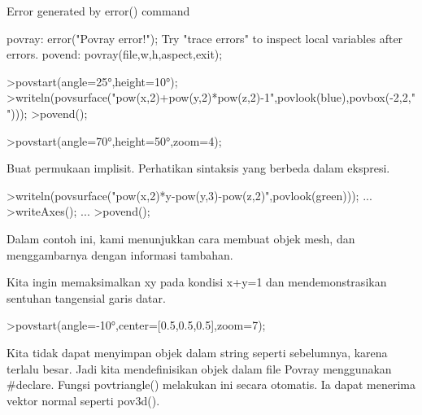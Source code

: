 \documentclass[a4paper,10pt]{article}
\begin{document}
\begin{eulernotebook}
\begin{eulercomment}
\begin{eulercomment}
\begin{euleroutput}
  Error generated by error() command
  
  povray:
      error("Povray error!");
  Try "trace errors" to inspect local variables after errors.
  povend:
      povray(file,w,h,aspect,exit); 
\end{euleroutput}
\begin{eulerprompt}
>povstart(angle=25°,height=10°); 
>writeln(povsurface("pow(x,2)+pow(y,2)*pow(z,2)-1",povlook(blue),povbox(-2,2,"")));
>povend();
\end{eulerprompt}
\begin{eulerprompt}
>povstart(angle=70°,height=50°,zoom=4);
\end{eulerprompt}
\begin{eulercomment}
Buat permukaan implisit. Perhatikan sintaksis yang berbeda dalam
ekspresi.
\end{eulercomment}
\begin{eulerprompt}
>writeln(povsurface("pow(x,2)*y-pow(y,3)-pow(z,2)",povlook(green))); ...
>writeAxes(); ...
>povend();
\end{eulerprompt}
\begin{eulercomment}
Dalam contoh ini, kami menunjukkan cara membuat objek mesh, dan
menggambarnya dengan informasi tambahan.

Kita ingin memaksimalkan xy pada kondisi x+y=1 dan mendemonstrasikan
sentuhan tangensial garis datar.
\end{eulercomment}
\begin{eulerprompt}
>povstart(angle=-10°,center=[0.5,0.5,0.5],zoom=7);
\end{eulerprompt}
\begin{eulercomment}
Kita tidak dapat menyimpan objek dalam string seperti sebelumnya,
karena terlalu besar. Jadi kita mendefinisikan objek dalam file Povray
menggunakan #declare. Fungsi povtriangle() melakukan ini secara
otomatis. Ia dapat menerima vektor normal seperti pov3d().


\end{eulercomment}
\end{eulercomment}
\end{eulercomment}
\end{eulernotebook}
\end{document}
